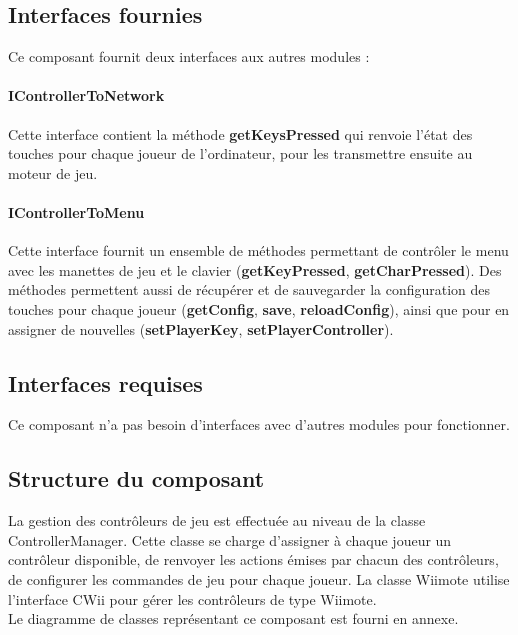 \subsection{Interfaces fournies}

Ce composant fournit deux interfaces aux autres modules :

\paragraph{IControllerToNetwork}

Cette interface contient la méthode \textbf{getKeysPressed} qui renvoie l'état des touches pour chaque joueur de l'ordinateur, pour les transmettre ensuite au moteur de jeu.

\paragraph{IControllerToMenu}

Cette interface fournit un ensemble de méthodes permettant de contrôler le menu avec les manettes de jeu et le clavier (\textbf{getKeyPressed}, \textbf{getCharPressed}). Des méthodes permettent aussi de récupérer et de sauvegarder la configuration des touches pour chaque joueur (\textbf{getConfig}, \textbf{save}, \textbf{reloadConfig}), ainsi que pour en assigner de nouvelles (\textbf{setPlayerKey}, \textbf{setPlayerController}).

\subsection{Interfaces requises}

Ce composant n'a pas besoin d'interfaces avec d'autres modules pour fonctionner.

\subsection{Structure du composant}

La gestion des contrôleurs de jeu est effectuée au niveau de la classe ControllerManager. Cette classe se charge d'assigner à chaque joueur un contrôleur disponible, de renvoyer les actions émises par chacun des contrôleurs, de configurer les commandes de jeu pour chaque joueur. La classe Wiimote utilise l'interface CWii pour gérer les contrôleurs de type Wiimote.\\

Le diagramme de classes représentant ce composant est fourni en annexe.